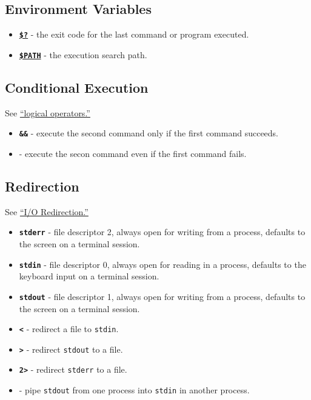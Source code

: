 \documentclass[10pt,]{book}
\numberwithin{figure}{chapter}
\begin{document}
\subsection{Environment Variables}\label{environment-variables}

\begin{itemize}
\itemsep1pt\parskip0pt
\item
  \href{http://linux.die.net/abs-guide/exit-status.html}{\textbf{\texttt{\$?}}}
  - the exit code for the last command or program executed.
\item
  \href{http://linux.die.net/Bash-Beginners-Guide/sect_03_02.html}{\textbf{\texttt{\$PATH}}}
  - the execution search path.
\end{itemize}

\subsection{Conditional Execution}\label{conditional-execution}

See \href{http://linux.die.net/abs-guide/ops.html}{``logical
operators.''}

\begin{itemize}
\itemsep1pt\parskip0pt
\item
  \textbf{\texttt{\&\&}} - execute the second command only if the first
  command succeeds.
\item
  \textbf{\texttt{\textbar{}\textbar{}}} - execute the secon command
  even if the first command fails.
\end{itemize}

\subsection{Redirection}\label{redirection}

See \href{http://linux.die.net/abs-guide/io-redirection.html}{``I/O
Redirection.''}

\begin{itemize}
\itemsep1pt\parskip0pt
\item
  \textbf{\texttt{stderr}} - file descriptor 2, always open for writing
  from a process, defaults to the screen on a terminal session.
\item
  \textbf{\texttt{stdin}} - file descriptor 0, always open for reading
  in a process, defaults to the keyboard input on a terminal session.
\item
  \textbf{\texttt{stdout}} - file descriptor 1, always open for writing
  from a process, defaults to the screen on a terminal session.
\item
  \textbf{\texttt{\textless{}}} - redirect a file to \texttt{stdin}.
\item
  \textbf{\texttt{\textgreater{}}} - redirect \texttt{stdout} to a file.
\item
  \textbf{\texttt{2\textgreater{}}} - redirect \texttt{stderr} to a
  file.
\item
  \textbf{\texttt{\textbar{}}} - pipe \texttt{stdout} from one process
  into \texttt{stdin} in another process.
\end{itemize}
\end{document}
